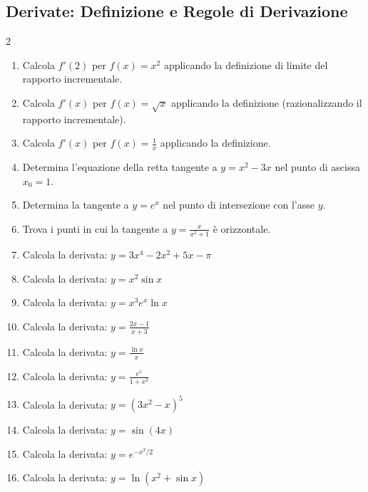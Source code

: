 \subsection{Derivate: Definizione e Regole di Derivazione}
\begin{multicols}{2}
\begin{enumerate}
    \item {} Calcola $f'(2)$ per $f(x) = x^2$ applicando la definizione di limite del rapporto incrementale.
    \item {} Calcola $f'(x)$ per $f(x) = \sqrt{x}$ applicando la definizione (razionalizzando il rapporto incrementale).
    \item {} Calcola $f'(x)$ per $f(x) = \frac{1}{x}$ applicando la definizione.
    \item {} Determina l'equazione della retta tangente a $y = x^2 - 3x$ nel punto di ascissa $x_0 = 1$.
    \item {} Determina la tangente a $y = e^x$ nel punto di intersezione con l'asse $y$.
    \item {} Trova i punti in cui la tangente a $y = \frac{x}{x^2+1}$ è orizzontale.
    \item {} Calcola la derivata: $y = 3x^4 - 2x^2 + 5x - \pi$
    \item {} Calcola la derivata: $y = x^2 \sin x$
    \item {} Calcola la derivata: $y = x^3 e^x \ln x$
    \item {} Calcola la derivata: $y = \frac{2x-1}{x+3}$
    \item {} Calcola la derivata: $y = \frac{\ln x}{x}$
    \item {} Calcola la derivata: $y = \frac{e^x}{1+x^2}$
    \item {} Calcola la derivata: $y = (3x^2 - x)^5$
    \item {} Calcola la derivata: $y = \sin(4x)$
    \item {} Calcola la derivata: $y = e^{-x^2/2}$
    \item {} Calcola la derivata: $y = \ln(x^2 + \sin x)$

\end{enumerate}
\end{multicols}

